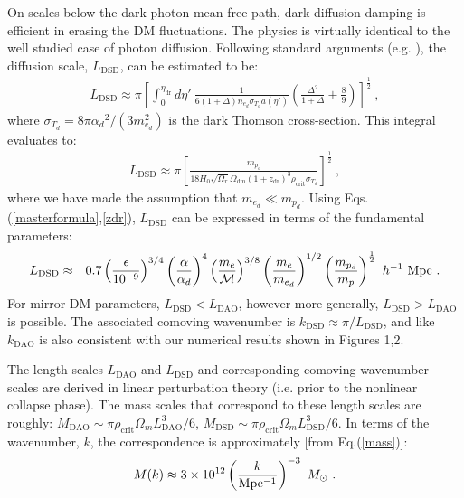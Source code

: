 \documentclass[12pt]{article}
\begin{document}
On scales below the dark photon mean free path, dark diffusion damping is efficient in erasing the DM fluctuations. 
The physics is virtually identical to the well studied case of photon diffusion. Following standard arguments (e.g. \cite{dodelson}),
the diffusion scale, $L_{\text{DSD}}$, can be estimated to be:
%
\begin{eqnarray}
L_{\text{DSD}} \approx \pi \left [ \int _0 ^{\eta _{\text{dr}}} d\eta ' \ \frac{1}{6(1 + \Delta)n_{e_d}\sigma _{T_d}a(\eta ')} \left ( \frac{\Delta ^2}{1 + \Delta} + \frac{8}{9} \right ) \right ] ^{\frac{1}{2}} \ ,
\end{eqnarray}
%
where $\sigma _{T_d} = 8\pi  {\alpha_d}^2/(3m_{e_d}^2)$ is the dark Thomson cross-section. This integral evaluates to:
%
\begin{eqnarray}
L_{\text{DSD}} \approx \pi \left [ \frac{m_{p_d}}{18H_0\sqrt{\Omega _r}\Omega_{\text{dm}}(1 + z_{\text{dr}}) ^3\rho _{\text{crit}}\sigma _{T_d}} \right ] ^{\frac{1}{2}} \ ,
\end{eqnarray}
%
where we have made the assumption that $m_{e_d} \ll m_{p_d}$. Using Eqs.(\ref{masterformula},\ref{zdr}), $L_{\text{DSD}}$ can be expressed in terms of the fundamental parameters:
%
\begin{eqnarray}
L_{\text{DSD}} & \approx & 0.7 \left( \frac{\epsilon}{10^{-9}}\right)^{3/4} \left( \frac{\alpha}{\alpha_d}\right)^4 \left(\frac{m_e}{{\cal M}}\right)^{3/8} \left(\frac{m_e}{m_{e_d}}\right)^{1/2} \left (\frac{m_{p_d}}{m_p} \right )^{\frac{1}{2}} \ h^{-1} \ {\rm Mpc} \ .
\label{Ld1}
\end{eqnarray}
%
For mirror DM parameters, $L_{\text{DSD}} < L_{\text{DAO}}$, however more generally, $L_{\text{DSD}} > L_{\text{DAO}}$ is possible. The associated comoving wavenumber is $k_{\text{DSD}} \approx \pi/L_{\text{DSD}}$, and like $k_{\text{DAO}}$ is also consistent with our numerical results shown in Figures 1,2.

%
%

The length scales $L_{\text{DAO}}$ and $L_{\text{DSD}}$ and corresponding comoving wavenumber scales are 
derived in linear perturbation theory (i.e. prior to the nonlinear collapse phase). The mass scales that 
correspond to these length scales are
roughly: $M_{\text{DAO}} \sim \pi \rho_{\text{crit}} \Omega_m L_{\text{DAO}}^3/6$,  $M_{\text{DSD}} \sim 
\pi \rho_{\text{crit}}\Omega_m L_{\text{DSD}}^3/6$. In terms of the wavenumber, $k$, the correspondence is
approximately [from Eq.(\ref{mass})]:
%
\begin{eqnarray}
M(k) \approx 3\times 10^{12} \left ( \frac{k}{\rm Mpc^{-1}} \right ) ^{-3} \ M_\odot \ .
\end{eqnarray}
%
\end{document}
